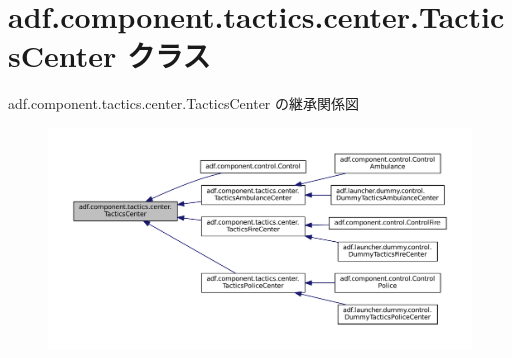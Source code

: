 \hypertarget{classadf_1_1component_1_1tactics_1_1center_1_1TacticsCenter}{}\section{adf.\+component.\+tactics.\+center.\+Tactics\+Center クラス}
\label{classadf_1_1component_1_1tactics_1_1center_1_1TacticsCenter}


adf.\+component.\+tactics.\+center.\+Tactics\+Center の継承関係図
\nopagebreak
\begin{figure}[H]
\begin{center}
\leavevmode
\includegraphics[width=350pt]{classadf_1_1component_1_1tactics_1_1center_1_1TacticsCenter__inherit__graph}
\end{center}
\end{figure}
